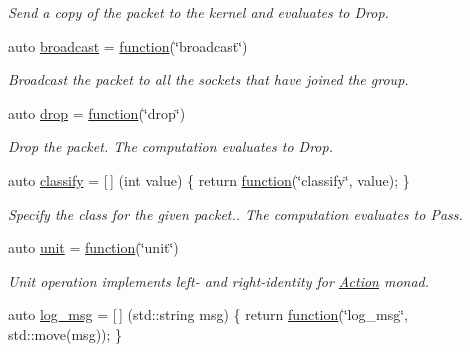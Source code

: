 \begin{DoxyCompactItemize}
\begin{DoxyCompactList}\small\item\em Send a copy of the packet to the kernel and evaluates to {\ttfamily Drop}. \end{DoxyCompactList}\item 
auto \hyperlink{namespacepfq_1_1lang_1_1anonymous__namespace_02default_8hpp_03_ac9e0f3ad7fa32146565f4aaab709d19d}{broadcast} = \hyperlink{namespacepfq_1_1lang_a1a4638059d700ae08d0ca63886ff2bb3}{function}(\char`\"{}broadcast\char`\"{})
\begin{DoxyCompactList}\small\item\em Broadcast the packet to all the sockets that have joined the group. \end{DoxyCompactList}\item 
auto \hyperlink{namespacepfq_1_1lang_1_1anonymous__namespace_02default_8hpp_03_a0d715988e000ac6284a1615091eb4067}{drop} = \hyperlink{namespacepfq_1_1lang_a1a4638059d700ae08d0ca63886ff2bb3}{function}(\char`\"{}drop\char`\"{})
\begin{DoxyCompactList}\small\item\em Drop the packet. The computation evaluates to {\ttfamily Drop}. \end{DoxyCompactList}\item 
auto \hyperlink{namespacepfq_1_1lang_1_1anonymous__namespace_02default_8hpp_03_a4f0a980be076a3958156b7053ac06912}{classify} = \mbox{[}$\,$\mbox{]} (int value) \{ return \hyperlink{namespacepfq_1_1lang_a1a4638059d700ae08d0ca63886ff2bb3}{function}(\char`\"{}classify\char`\"{}, value); \}
\begin{DoxyCompactList}\small\item\em Specify the class for the given packet.. The computation evaluates to {\ttfamily Pass}. \end{DoxyCompactList}\item 
auto \hyperlink{namespacepfq_1_1lang_1_1anonymous__namespace_02default_8hpp_03_a85f9b2d401cbb1d135679160de0e97de}{unit} = \hyperlink{namespacepfq_1_1lang_a1a4638059d700ae08d0ca63886ff2bb3}{function}(\char`\"{}unit\char`\"{})
\begin{DoxyCompactList}\small\item\em Unit operation implements left-\/ and right-\/identity for \hyperlink{structpfq_1_1lang_1_1Action}{Action} monad. \end{DoxyCompactList}\item 
auto \hyperlink{namespacepfq_1_1lang_1_1anonymous__namespace_02default_8hpp_03_a82e76226844f043aac9a2dd01615c9bb}{log\+\_\+msg} = \mbox{[}$\,$\mbox{]} (std\+::string msg) \{ return \hyperlink{namespacepfq_1_1lang_a1a4638059d700ae08d0ca63886ff2bb3}{function}(\char`\"{}log\+\_\+msg\char`\"{}, std\+::move(msg)); \}

\end{DoxyCompactItemize}
